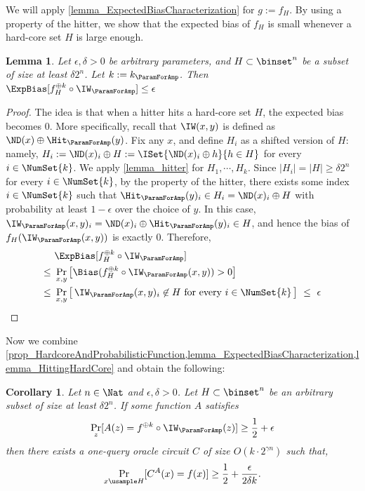 \documentclass[11pt]{article}
\numberwithin{equation}{section}
\newtheorem{lemma}[theorem]{Lemma}
\newtheorem{corollary}[theorem]{Corollary}
\theoremstyle{definition}
\theoremstyle{plain}
\begin{document}
We will apply \cref{lemma_ExpectedBiasCharacterization} for $g := f_H$.
By using a property of the hitter, we show that the expected bias of $f_H$ is small whenever a hard-core set $H$ is large enough.
\begin{lemma}
  \label{lemma_HittingHardCore}
  Let $\epsilon, \delta > 0$ be arbitrary parameters, and $H \subset \binset^n$ be a subset of size at least $\delta 2^n$.
  Let $k := k_\ParamForAmp$.
  Then
  $\ExpBias[f_H^{\oplus k} \circ \IW_\ParamForAmp] \le \epsilon$
\end{lemma}
\begin{proof}
  The idea is that when a hitter hits a hard-core set $H$, the expected bias becomes $0$.
  More specifically,
  recall that $\IW(x, y)$ is defined as $\ND(x) \oplus \Hit_\ParamForAmp(y)$.
  Fix any $x$, and define $H_i$ as a shifted version of $H$: namely, $H_i := \ND(x)_i \oplus H := \ISet{\ND(x)_i \oplus h}{h \in H}$ for every $i \in \NumSet{k}$.
  We apply \cref{lemma_hitter} for $H_1, \cdots, H_k$.
  Since $|H_i| = |H| \ge \delta 2^n$ for every $i \in \NumSet{k}$, by the property of the hitter,
  there exists some index $i \in \NumSet{k}$
  such that
  $\Hit_\ParamForAmp(y)_i \in H_i = \ND(x)_i \oplus H$ with probability at least $1 - \epsilon$ over the choice of $y$.
  In this case,
  $\IW_\ParamForAmp(x, y)_i = \ND(x)_i \oplus \Hit_\ParamForAmp(y)_i \in H$,
  and hence the bias of $f_H(\IW_\ParamForAmp(x, y))$ is exactly $0$.
  Therefore,
  \begin{align*}
    \  & \ExpBias[f_H^{\oplus k} \circ \IW_\ParamForAmp]
    \\ \le\ & \Pr_{x, y} \left[ \Bias( f_H^{\oplus k} \circ \IW_\ParamForAmp (x, y) )  > 0\right]
    \\ \le\ & \Pr_{x, y} \left[\, \IW_\ParamForAmp(x, y)_i \not\in H \text{ for every $i\in\NumSet{k}$}\, \right]\ \le\ \epsilon
  \end{align*}
\end{proof}

Now we combine \cref{prop_HardcoreAndProbabilisticFunction,lemma_ExpectedBiasCharacterization,lemma_HittingHardCore}
and obtain the following:

\begin{corollary}
  \label{cor_BoostingPremise}
  Let $n \in \Nat$ and $\epsilon, \delta > 0$.
  Let $H \subset \binset^n$ be an arbitrary subset of size at least $\delta 2^n$.
  If some function $A$ satisfies
  \begin{align*}
    \Pr_z[ A(z) = f^{\oplus k} \circ \IW_\ParamForAmp(z) ] \ge \frac{1}{2} + \epsilon
  \end{align*}
  then
  there exists a one-query oracle circuit $C$ of size $O(k \cdot 2^{\gamma n})$ such that,
  \begin{align*}
    \Pr_{x \usample H} [ C^A(x) = f(x) ] \ge \frac{1}{2} + \frac{\epsilon } { 2 \delta k }.
  \end{align*}
\end{corollary}
\end{document}

